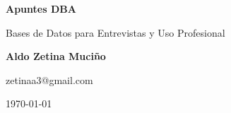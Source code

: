\documentclass[12pt, a4paper, openany]{book}
\begin{document}
\begin{titlepage}
  \centering
  \vspace*{3cm}
  {\Huge\bfseries Apuntes DBA\par}
  \vspace{1em}
  {\Large Bases de Datos para Entrevistas y Uso Profesional\par}
  \vspace{3cm}
  {\large\bfseries Aldo Zetina Muci\~no\par}
  \vspace{0.5em}
  {\normalsize zetinaa3@gmail.com\par}
  \vfill
  {\normalsize \today\par}
\end{titlepage}

\tableofcontents
\newpage















\end{document}
